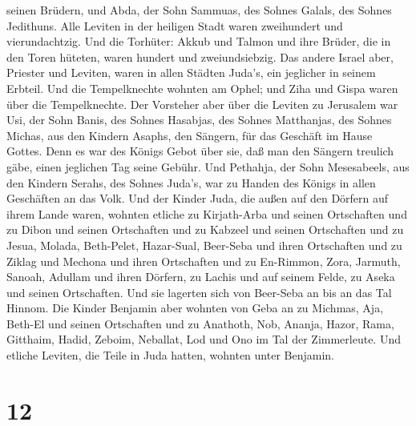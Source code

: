 seinen Brüdern, und Abda, der Sohn Sammuas, des Sohnes Galals, des
Sohnes Jedithuns.  Alle Leviten in der heiligen Stadt waren
zweihundert und vierundachtzig.  Und die Torhüter: Akkub
und Talmon und ihre Brüder, die in den Toren hüteten, waren hundert und
zweiundsiebzig.  Das andere Israel aber, Priester und
Leviten, waren in allen Städten Juda's, ein jeglicher in seinem Erbteil.
 Und die Tempelknechte wohnten am Ophel; und Ziha und Gispa
waren über die Tempelknechte.  Der Vorsteher aber über die
Leviten zu Jerusalem war Usi, der Sohn Banis, des Sohnes Hasabjas, des
Sohnes Matthanjas, des Sohnes Michas, aus den Kindern Asaphs, den
Sängern, für das Geschäft im Hause Gottes.  Denn es war des
Königs Gebot über sie, daß man den Sängern treulich gäbe, einen
jeglichen Tag seine Gebühr.  Und Pethahja, der Sohn
Mesesabeels, aus den Kindern Serahs, des Sohnes Juda's, war zu Handen
des Königs in allen Geschäften an das Volk.  Und der Kinder
Juda, die außen auf den Dörfern auf ihrem Lande waren, wohnten etliche
zu Kirjath-Arba und seinen Ortschaften und zu Dibon und seinen
Ortschaften und zu Kabzeel und seinen Ortschaften  und zu
Jesua, Molada, Beth-Pelet,  Hazar-Sual, Beer-Seba und ihren
Ortschaften  und zu Ziklag und Mechona und ihren
Ortschaften  und zu En-Rimmon, Zora, Jarmuth, 
Sanoah, Adullam und ihren Dörfern, zu Lachis und auf seinem Felde, zu
Aseka und seinen Ortschaften. Und sie lagerten sich von Beer-Seba an bis
an das Tal Hinnom.  Die Kinder Benjamin aber wohnten von
Geba an zu Michmas, Aja, Beth-El und seinen Ortschaften 
und zu Anathoth, Nob, Ananja,  Hazor, Rama, Gitthaim,
 Hadid, Zeboim, Neballat,  Lod und Ono im Tal
der Zimmerleute.  Und etliche Leviten, die Teile in Juda
hatten, wohnten unter Benjamin.

\hypertarget{section-11}{%
\section{12}\label{section-11}}


